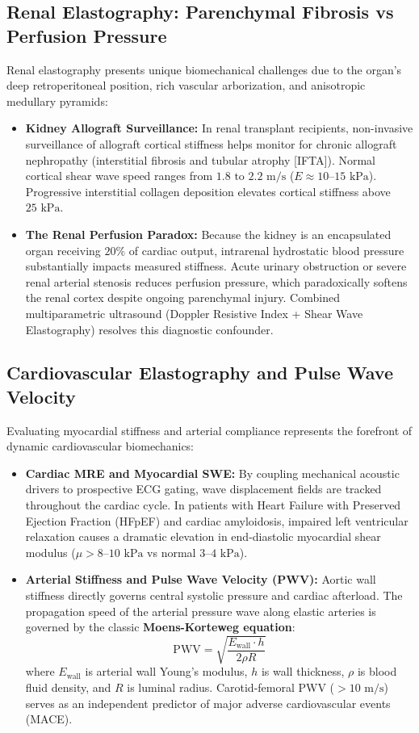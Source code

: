 \documentclass[11pt,a4paper]{article}
\begin{document}
\subsection{Renal Elastography: Parenchymal Fibrosis vs Perfusion Pressure}
Renal elastography presents unique biomechanical challenges due to the organ's deep retroperitoneal position, rich vascular arborization, and anisotropic medullary pyramids:
\begin{itemize}[leftmargin=2em]
    \item \textbf{Kidney Allograft Surveillance:} In renal transplant recipients, non-invasive surveillance of allograft cortical stiffness helps monitor for chronic allograft nephropathy (interstitial fibrosis and tubular atrophy [IFTA]). Normal cortical shear wave speed ranges from $1.8\text{ to }2.2\text{ m/s}$ ($E \approx 10\text{--}15\text{ kPa}$). Progressive interstitial collagen deposition elevates cortical stiffness above $25\text{ kPa}$.
    \item \textbf{The Renal Perfusion Paradox:} Because the kidney is an encapsulated organ receiving $20\%$ of cardiac output, intrarenal hydrostatic blood pressure substantially impacts measured stiffness. Acute urinary obstruction or severe renal arterial stenosis reduces perfusion pressure, which paradoxically softens the renal cortex despite ongoing parenchymal injury. Combined multiparametric ultrasound (Doppler Resistive Index + Shear Wave Elastography) resolves this diagnostic confounder.
\end{itemize}

\subsection{Cardiovascular Elastography and Pulse Wave Velocity}
Evaluating myocardial stiffness and arterial compliance represents the forefront of dynamic cardiovascular biomechanics:
\begin{itemize}[leftmargin=2em]
    \item \textbf{Cardiac MRE and Myocardial SWE:} By coupling mechanical acoustic drivers to prospective ECG gating, wave displacement fields are tracked throughout the cardiac cycle. In patients with Heart Failure with Preserved Ejection Fraction (HFpEF) and cardiac amyloidosis, impaired left ventricular relaxation causes a dramatic elevation in end-diastolic myocardial shear modulus ($\mu > 8\text{--}10\text{ kPa}$ vs normal $3\text{--}4\text{ kPa}$).
    \item \textbf{Arterial Stiffness and Pulse Wave Velocity (PWV):} Aortic wall stiffness directly governs central systolic pressure and cardiac afterload. The propagation speed of the arterial pressure wave along elastic arteries is governed by the classic \textbf{Moens-Korteweg equation}:
\begin{equation}
    \text{PWV} = \sqrt{\frac{E_{\text{wall}} \cdot h}{2\rho R}}
\end{equation}
where $E_{\text{wall}}$ is arterial wall Young's modulus, $h$ is wall thickness, $\rho$ is blood fluid density, and $R$ is luminal radius. Carotid-femoral PWV ($> 10\text{ m/s}$) serves as an independent predictor of major adverse cardiovascular events (MACE).
\end{itemize}
\end{document}
